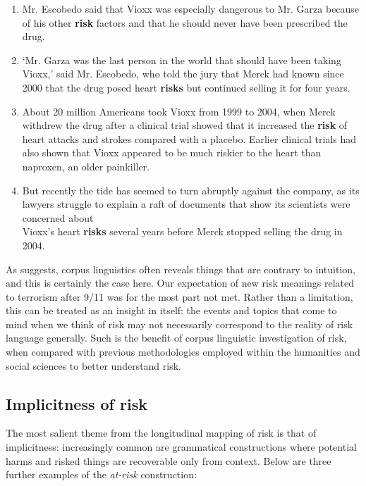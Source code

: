 \begin{enumerate}  [before=\color{black}\ttfamily] \setlength\itemsep{0em} \small
\item Mr. Escobedo said that Vioxx was especially dangerous to Mr. Garza because of his other \textbf{risk} factors and that he should never have been prescribed the drug.
\item `Mr. Garza was the last person in the world that should have been taking Vioxx,' said Mr. Escobedo, who told the jury that Merck had known since 2000 that the drug posed heart \textbf{risks} but continued selling it for four years.
\item About 20 million Americans took Vioxx from 1999 to 2004, when Merck withdrew the drug after a clinical trial showed that it increased the \textbf{risk} of heart attacks and strokes compared with a placebo. Earlier clinical trials had also shown that Vioxx appeared to be much riskier to the heart than naproxen, an older painkiller.
\item But recently the tide has seemed to turn abruptly against the company, as its lawyers struggle to explain a raft of documents that show its scientists were concerned about \\ Vioxx's heart \textbf{risks} several years before Merck stopped selling the drug in 2004. 
\end{enumerate}
%
As  suggests, corpus linguistics often reveals things that are contrary to intuition, and this is certainly the case here. Our expectation of new risk meanings related to terrorism after 9\slash 11 was for the most part not met. Rather than a limitation, this can be treated as an insight in itself: the events and topics that come to mind when we think of risk may not necessarily correspond to the reality of risk language generally. Such is the benefit of corpus linguistic investigation of risk, when compared with previous methodologies employed within the humanities and social sciences to better understand risk.

\subsection{Implicitness of risk}

The most salient theme from the longitudinal mapping of risk is that of implicitness: increasingly common are grammatical constructions where potential harms and risked things are recoverable only from context. Below are three further examples of the \emph{at-risk} construction:

